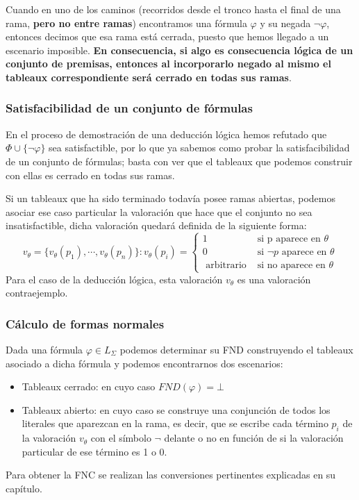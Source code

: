 \documentclass[10pt,a4paper,openright]{book}
\begin{document}
Cuando en uno de los caminos (recorridos desde el tronco hasta el final de una rama, \textbf{pero no entre ramas}) encontramos una fórmula $\varphi$ y su negada $\neg \varphi$, entonces decimos que esa rama está cerrada, puesto que hemos llegado a un escenario imposible. \textbf{En consecuencia, si algo es consecuencia lógica de un conjunto de premisas, entonces al incorporarlo negado al mismo el tableaux correspondiente será cerrado en todas sus ramas}.

\subsubsection*{Satisfacibilidad de un conjunto de fórmulas}
En el proceso de demostración de una deducción lógica hemos refutado que $\Phi\cup\{\neg\varphi\}$ sea satisfactible, por lo que ya sabemos como probar la satisfacibilidad de un conjunto de fórmulas; basta con ver que el tableaux que podemos construir con ellas es cerrado en todas sus ramas.

Si un tableaux que ha sido terminado todavía posee ramas abiertas, podemos asociar ese caso particular la valoración que hace que el conjunto no sea insatisfactible, dicha valoración quedará definida de la siguiente forma:
$$v_\theta = \{v_\theta (p_1), \cdots, v_\theta (p_n)\}: v_\theta (p_i) = \begin{cases} 1 & \mbox{ si p aparece en }\theta \\ 0 & \mbox{ si }\neg p\mbox{ aparece en }\theta \\ \mbox{ arbitrario} & \mbox{ si no aparece en }\theta \end{cases}$$
Para el caso de la deducción lógica, esta valoración $v_\theta$ es una valoración contraejemplo.

\subsubsection*{Cálculo de formas normales}
Dada una fórmula $\varphi \in L_\Sigma$	podemos determinar su FND construyendo el tableaux asociado a dicha fórmula y podemos encontrarnos dos escenarios:
\begin{itemize}
\item Tableaux cerrado: en cuyo caso $FND(\varphi) = \bot$
\item Tableaux abierto: en cuyo caso se construye una conjunción de todos los literales que aparezcan en la rama, es decir, que se escribe cada término $p_i$ de la valoración $v_\theta$ con el símbolo $\neg$ delante o no en función de si la valoración particular de ese término es 1 o 0.
\end{itemize}
Para obtener la FNC se realizan las conversiones pertinentes explicadas en su capítulo.
\end{document}
